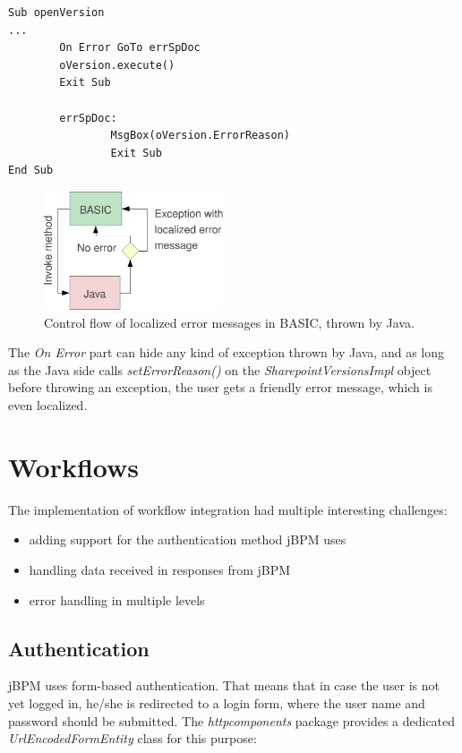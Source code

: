 \begin{lstlisting}
Sub openVersion
...
        On Error GoTo errSpDoc
        oVersion.execute()
        Exit Sub

        errSpDoc:
                MsgBox(oVersion.ErrorReason)
                Exit Sub
End Sub
\end{lstlisting}

\begin{figure}[H]
\centering
\includegraphics[width=200px,keepaspectratio]{basic-l10n.pdf}
\caption{Control flow of localized error messages in BASIC, thrown by Java.}
\label{fig:basic-l10n}
\end{figure}

The \emph{On Error} part can hide any kind of exception thrown by Java, and as
long as the Java side calls \emph{setErrorReason()} on the
\emph{SharepointVersionsImpl} object before throwing an exception, the user gets
a friendly error message, which is even localized.

\section{Workflows}

The implementation of workflow integration had multiple interesting challenges:

\begin{itemize}
\item adding support for the authentication method jBPM uses
\item handling data received in responses from jBPM
\item error handling in multiple levels
\end{itemize}

\subsection{Authentication}

jBPM uses form-based authentication. That means that in case the user is not
yet logged in, he/she is redirected to a login form, where the user name and
password should be submitted. The \emph{httpcomponents} package provides a
dedicated \emph{UrlEncodedFormEntity} class for this purpose:

